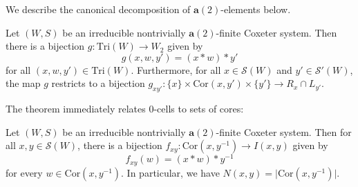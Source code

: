 \documentclass[ALCO,Unicode,published]{cedram}
\newcommand{\cals}{\mathcal{S}}
\newcommand{\la}{\mathbf{a}}
\newcommand{\sw}{\mathcal{S}(W)}
\newcommand{\triples}{\mathrm{Tri}(W) }
\newcommand{\cores}{\mathrm{Cor}}
\newcommand{\ntatf}{nontrivially $\la(2)$-finite }
\newcommand{\ra}{\rightarrow}
\newcommand{\inverse}{^{-1}}
\newcommand{\abs}[1]{\lvert #1 \rvert}
\begin{document}
We describe the canonical decomposition of $\la(2)$-elements below.

\begin{thm}
    \label{thm:anatomy}
    Let $(W,S)$ be an irreducible \ntatf Coxeter system. Then there is a bijection $g:\triples
    \ra W_2$ given by 
    \[
        g(x,w,y')=(x*w)*y'
    \]
    for all $(x,w,y')\in \triples$. Furthermore, for all $x\in \sw$
    and $y'\in \cals'(W)$, the map $g$ restricts to a bijection $g_{xy'}: \{x\}\times \cores(x,y')\times \{y'\}\ra
    R_x\cap L_{y'}$.
\end{thm}

\noindent
The theorem immediately relates 0-cells to sets of cores:

\begin{corollary}
    Let $(W,S)$ be an irreducible \ntatf Coxeter system. Then for all
    $x,y\in\sw$, there is a bijection $f_{xy}: \cores(x,y\inverse)\ra I(x,y)$ given by 
    \[
        f_{xy}(w)=(x*w)*y\inverse
    \]
    for every $w\in\cores(x,y\inverse)$. In particular, we have $N(x,y)=\abs{\cores(x,y\inverse)}$.
    \label{coro:intersectionsViaCores}
\end{corollary}
\end{document}
